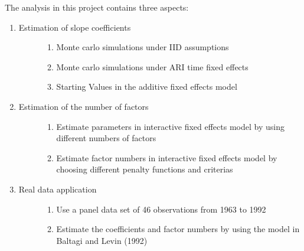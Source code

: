 \documentclass[a4paper,11pt,english]{sphinxmanual}
\begin{document}
\sphinxAtStartPar
The analysis in this project contains three aspects:
\begin{enumerate}
%
\item {} \begin{description}
\item[{Estimation of slope coefficients}] \leavevmode\begin{enumerate}
%
\item {} 
\sphinxAtStartPar
Monte carlo simulations under IID assumptions

\item {} 
\sphinxAtStartPar
Monte carlo simulations under ARI time fixed effects

\item {} 
\sphinxAtStartPar
Starting Values in the additive fixed effects model

\end{enumerate}

\end{description}

\item {} \begin{description}
\item[{Estimation of the number of factors}] \leavevmode\begin{enumerate}
%
\item {} 
\sphinxAtStartPar
Estimate parameters in interactive fixed effects model by using different numbers of factors

\item {} 
\sphinxAtStartPar
Estimate factor numbers in interactive fixed effects model by choosing different penalty functions and criterias

\end{enumerate}

\end{description}

\item {} \begin{description}
\item[{Real data application}] \leavevmode\begin{enumerate}
%
\item {} 
\sphinxAtStartPar
Use a panel data set of 46 observations from 1963 to 1992

\item {} 
\sphinxAtStartPar
Estimate the coefficients and factor numbers by using the model in Baltagi and Levin (1992)

\end{enumerate}

\end{description}

\end{enumerate}
\end{document}
